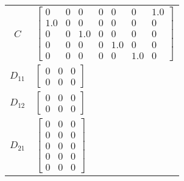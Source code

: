 \begin{tabular}{cl}
   $C$    & $\left[\begin{matrix}0 & 0 & 0 & 0 & 0 & 0 & 1.0\\1.0 & 0 & 0 & 0 & 0 & 0 & 0\\0 & 0 & 1.0 & 0 & 0 & 0 & 0\\0 & 0 & 0 & 0 & 1.0 & 0 & 0\\0 & 0 & 0 & 0 & 0 & 1.0 & 0\end{matrix}\right]$                                                                                                        \\
 $D_{11}$ & $\left[\begin{matrix}0 & 0 & 0\\0 & 0 & 0\end{matrix}\right]$                                                                                                                                                                                                                                   \\
 $D_{12}$ & $\left[\begin{matrix}0 & 0 & 0\\0 & 0 & 0\end{matrix}\right]$                                                                                                                                                                                                                                   \\
 $D_{21}$ & $\left[\begin{matrix}0 & 0 & 0\\0 & 0 & 0\\0 & 0 & 0\\0 & 0 & 0\\0 & 0 & 0\end{matrix}\right]$                                                                                                                                                                                                  \\
\hline
\end{tabular}